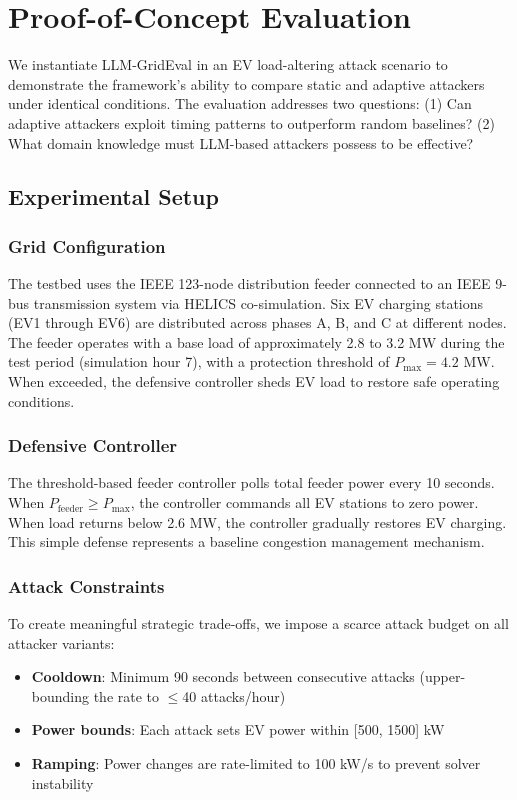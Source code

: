 
\section{Proof-of-Concept Evaluation}

We instantiate LLM-GridEval in an EV load-altering attack scenario to demonstrate the framework's ability to compare static and adaptive attackers under identical conditions. The evaluation addresses two questions: (1) Can adaptive attackers exploit timing patterns to outperform random baselines? (2) What domain knowledge must LLM-based attackers possess to be effective?

\subsection{Experimental Setup}

\subsubsection{Grid Configuration}
The testbed uses the IEEE 123-node distribution feeder connected to an IEEE 9-bus transmission system via HELICS co-simulation. Six EV charging stations (EV1 through EV6) are distributed across phases A, B, and C at different nodes. The feeder operates with a base load of approximately 2.8 to 3.2 MW during the test period (simulation hour 7), with a protection threshold of $P_{\max} = 4.2$ MW. When exceeded, the defensive controller sheds EV load to restore safe operating conditions.

\subsubsection{Defensive Controller}
The threshold-based feeder controller polls total feeder power every 10 seconds. When $P_{\text{feeder}} \geq P_{\max}$, the controller commands all EV stations to zero power. When load returns below 2.6 MW, the controller gradually restores EV charging. This simple defense represents a baseline congestion management mechanism.

\subsubsection{Attack Constraints}
To create meaningful strategic trade-offs, we impose a scarce attack budget on all attacker variants:
\begin{itemize}
    \item \textbf{Cooldown}: Minimum 90 seconds between consecutive attacks (upper-bounding the rate to $\leq$40 attacks/hour)
    \item \textbf{Power bounds}: Each attack sets EV power within [500, 1500] kW
    \item \textbf{Ramping}: Power changes are rate-limited to 100 kW/s to prevent solver instability
\end{itemize}

